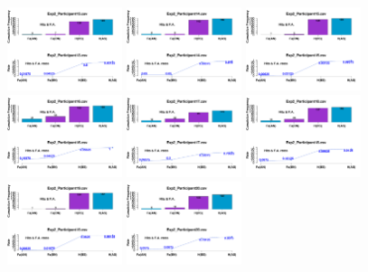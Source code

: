 \begin{figure}[th]
\includegraphics[width=0.30\textwidth]{Figures/MirrorRate_Exp2_P13} \includegraphics[width=0.30\textwidth]{Figures/MirrorRate_Exp2_P14} \includegraphics[width=0.30\textwidth]{Figures/MirrorRate_Exp2_P15}
\includegraphics[width=0.30\textwidth]{Figures/MirrorRate_Exp2_P16} \includegraphics[width=0.30\textwidth]{Figures/MirrorRate_Exp2_P17} \includegraphics[width=0.30\textwidth]{Figures/MirrorRate_Exp2_P18}
\includegraphics[width=0.30\textwidth]{Figures/MirrorRate_Exp2_P19} \includegraphics[width=0.30\textwidth]{Figures/MirrorRate_Exp2_P20} 

\end{figure}
